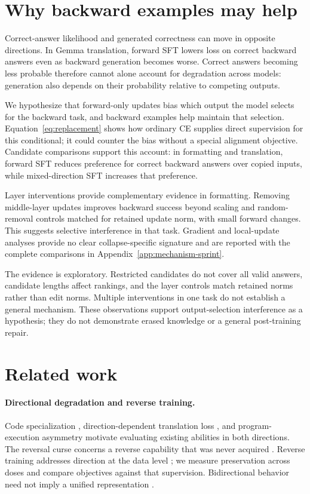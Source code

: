 \documentclass[11pt]{article}
\begin{document}
\section{Why backward examples may help}
\label{sec:mechanism}

Correct-answer likelihood and generated correctness can move in opposite directions.
In Gemma translation, forward SFT lowers loss on correct backward answers even as backward
generation becomes worse. Correct answers becoming less probable therefore cannot alone
account for degradation across models: generation also depends on their probability
relative to competing outputs.

We hypothesize that forward-only updates bias which output the model selects for the
backward task, and backward examples help maintain that selection. Equation~\ref{eq:replacement}
shows how ordinary CE supplies direct supervision for this conditional; it could counter
the bias without a special alignment objective. Candidate comparisons support this account:
in formatting and translation, forward SFT reduces preference for correct backward answers
over copied inputs, while mixed-direction SFT increases that preference.

Layer interventions provide complementary evidence in formatting. Removing middle-layer
updates improves backward success beyond scaling and random-removal controls matched for
retained update norm, with small forward changes. This suggests selective interference in
that task. Gradient and local-update analyses provide no clear collapse-specific signature
and are reported with the complete comparisons in Appendix~\ref{app:mechanism-sprint}.

The evidence is exploratory. Restricted candidates do not cover all valid answers, candidate
lengths affect rankings, and the layer controls match retained norms rather than edit norms.
Multiple interventions in one task do not establish a general mechanism. These observations
support output-selection interference as a hypothesis; they do not demonstrate erased
knowledge or a general post-training repair.

\section{Related work}
\label{sec:related}
\paragraph{Directional degradation and reverse training.}
Code specialization \citep{nikiema2025contrastive}, direction-dependent translation loss
\citep{zhu2024finetuning}, and program-execution asymmetry
\citep{hasanov2026pathnottaken} motivate evaluating existing abilities in both directions.
The reversal curse concerns a reverse capability that was never acquired
\citep{berglund2024reversal}. Reverse training addresses direction at the data level
\citep{golovneva2024reversetraining}; we measure preservation across doses and compare
objectives against that supervision. Bidirectional behavior need not imply a unified
representation \citep{latentgen2026illusion}.
\end{document}
